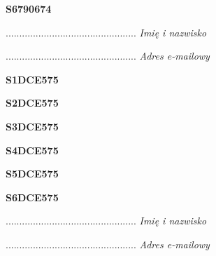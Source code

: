 \begin{turn}{90}\huge \textbf{S6790674}\end{turn}

\begin{turn}{90}\begin{minipage}{\linewidth} \vspace{20mm} ................................................  \textit{Imię i nazwisko}\end{minipage}\end{turn}

\begin{turn}{90}\begin{minipage}{\linewidth} \vspace{20mm} ................................................  \textit{Adres e-mailowy}\end{minipage}\end{turn}

\begin{turn}{90}\huge \textbf{S1DCE575}\end{turn}

\begin{turn}{90}\huge \textbf{S2DCE575}\end{turn}

\begin{turn}{90}\huge \textbf{S3DCE575}\end{turn}

\begin{turn}{90}\huge \textbf{S4DCE575}\end{turn}

\begin{turn}{90}\huge \textbf{S5DCE575}\end{turn}

\begin{turn}{90}\huge \textbf{S6DCE575}\end{turn}

\begin{turn}{90}\begin{minipage}{\linewidth} \vspace{20mm} ................................................  \textit{Imię i nazwisko}\end{minipage}\end{turn}

\begin{turn}{90}\begin{minipage}{\linewidth} \vspace{20mm} ................................................  \textit{Adres e-mailowy}\end{minipage}\end{turn}

